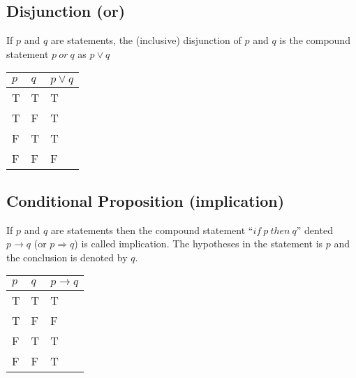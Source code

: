 \subsection{Disjunction (or)}
If $p$ and $q$ are statements, the (inclusive) disjunction of $p$ and $q$ is the compound statement $p\ or\ q$ as $p \vee q$
\begin{table}[H]
    \centering
    \begin{tabular}{C{0.1\textwidth} C{0.1\textwidth} C{0.1\textwidth}}
        $p$ & $q$ & $p \vee q$\\
        \hline
        \hline
        T & T & T\\
        \hline
        T & F & T \\
        \hline
        F & T & T \\
        \hline
        F & F & F\\
        \hline
    \end{tabular}
\end{table}

\subsection{Conditional Proposition (implication)}
If $p$ and $q$ are statements then the compound statement ``$if\ p\ then\ q$'' dented $p \rightarrow q$ (or $p \Rightarrow q$) is called implication. The hypotheses in the statement is $p$ and the conclusion is denoted by $q$.

\begin{table}[H]
    \centering
    \begin{tabular}{C{0.1\textwidth} C{0.1\textwidth} C{0.1\textwidth}}
        $p$ & $q$ & $p \rightarrow q$\\
        \hline
        \hline
        T & T & T\\
        \hline
        T & F & F \\
        \hline
        F & T & T \\
        \hline
        F & F & T\\
        \hline
    \end{tabular}
\end{table}

